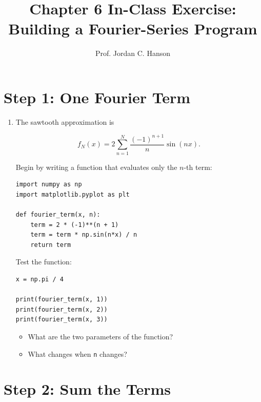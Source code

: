 \documentclass{article}
\begin{document}
\twocolumn

\title{Chapter 6 In-Class Exercise: Building a Fourier-Series Program}
\author{Prof. Jordan C. Hanson}
\date{}

\maketitle

\section{Step 1: One Fourier Term}

\begin{enumerate}

\item The sawtooth approximation is

\[
f_N(x)=
2\sum_{n=1}^{N}
\frac{(-1)^{n+1}}{n}\sin(nx).
\]

Begin by writing a function that evaluates only the
$n$-th term:

\begin{verbatim}
import numpy as np
import matplotlib.pyplot as plt

def fourier_term(x, n):
    term = 2 * (-1)**(n + 1)
    term = term * np.sin(n*x) / n
    return term
\end{verbatim}

Test the function:

\begin{verbatim}
x = np.pi / 4

print(fourier_term(x, 1))
print(fourier_term(x, 2))
print(fourier_term(x, 3))
\end{verbatim}

\begin{itemize}
\item What are the two parameters of the function?
\item What changes when \texttt{n} changes?
\end{itemize}

\end{enumerate}


\section{Step 2: Sum the Terms}
\end{document}
